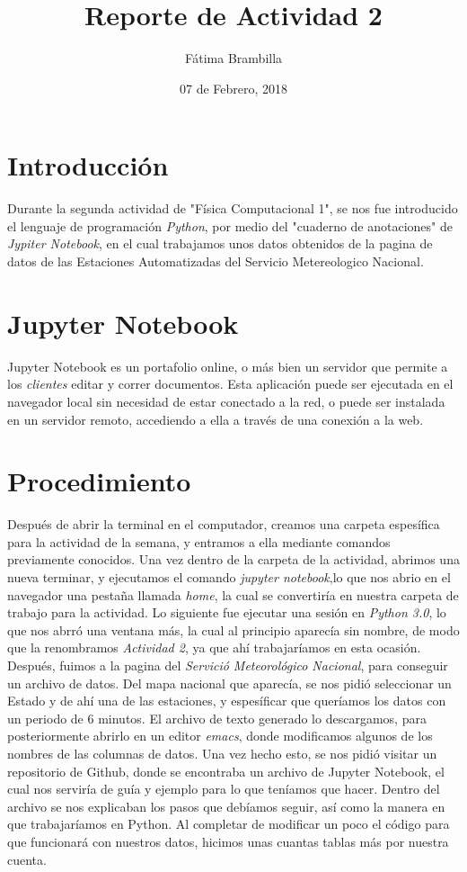 \documentclass{article}
\title{Reporte de Actividad 2}
\author{Fátima Brambilla}
\date{07 de Febrero, 2018}
\begin{document}
\maketitle

\section{Introducción}
Durante la segunda actividad de "Física Computacional 1", se nos fue introducido el lenguaje de programación \textit{Python}, por medio del "cuaderno de anotaciones" de \textit{Jypiter Notebook}, en el cual trabajamos unos datos obtenidos de la pagina de datos de las Estaciones Automatizadas del Servicio Metereologico Nacional.

\section{Jupyter Notebook}
Jupyter Notebook es un portafolio online, o más bien un servidor que permite a los \textit{clientes} editar y correr documentos. Esta aplicación puede ser ejecutada en el navegador local sin necesidad de estar conectado a la red, o puede ser instalada en un servidor remoto, accediendo a ella a través de una conexión a la web.

\section{Procedimiento}
Después de abrir la terminal en el computador, creamos una carpeta espesífica para la actividad de la semana, y entramos a ella mediante comandos previamente conocidos. Una vez dentro de la carpeta de la actividad, abrimos una nueva terminar, y ejecutamos el comando \textit{jupyter notebook},lo que nos abrio en el navegador una pestaña llamada \textit{home}, la cual se convertiría en nuestra carpeta de trabajo para la actividad.
Lo siguiente fue ejecutar una sesión en \textit{Python 3.0}, lo que nos abrró una ventana más, la cual al principio aparecía sin nombre, de modo que la renombramos \textit{Actividad 2}, ya que ahí trabajaríamos en esta ocasión.
Después, fuimos a la pagina del \textit{Servició Meteorológico Nacional}, para conseguir un archivo de datos. Del mapa nacional que aparecía, se nos pidió seleccionar un Estado y de ahí una de las estaciones, y espesíficar que queríamos los datos con un periodo de 6 minutos. El archivo de texto generado lo descargamos, para posteriormente abrirlo en un editor \textit{emacs}, donde modificamos algunos de los nombres de las columnas de datos.
Una vez hecho esto, se nos pidió visitar un repositorio de Github, donde se encontraba un archivo de Jupyter Notebook, el cual nos serviría de guía y ejemplo para lo que teníamos que hacer.
Dentro del archivo se nos explicaban los pasos que debíamos seguir, así como la manera en que trabajaríamos en Python.
Al completar de modificar un poco el código para que funcionará con nuestros datos, hicimos unas cuantas tablas más por nuestra cuenta.
\end{document}
